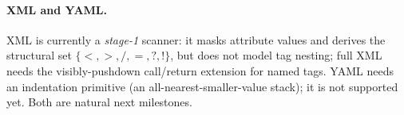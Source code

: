 \paragraph{XML and YAML.}
XML is currently a \emph{stage-1} scanner: it masks attribute
values and derives the structural set $\{<,>,/,=,?,!\}$, but does not model tag
nesting; full XML needs the visibly-pushdown call/return extension for named
tags.  YAML needs an indentation primitive (an all-nearest-smaller-value stack);
it is not supported yet.  Both are natural next milestones.
